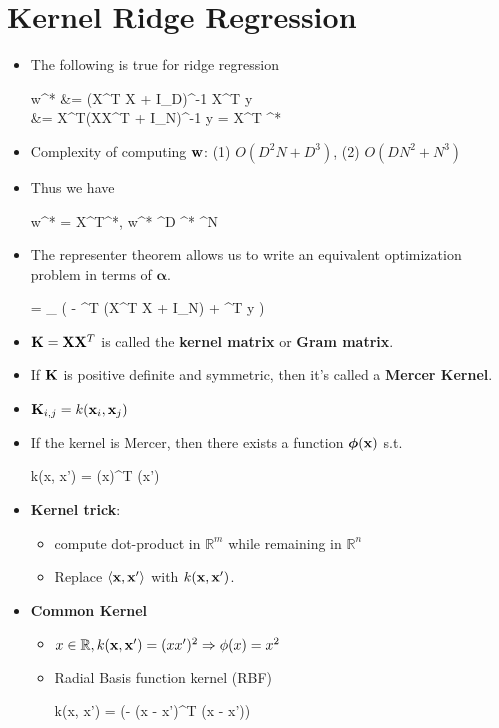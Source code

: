 \section{Kernel Ridge Regression}
\begin{itemize}
	\item The following is true for ridge regression
	\begin{myalign*}
	    \* w^* &= (\*X^T \*X + \lambda \*I_D)^{-1} \*X^T \*y \\
	    &= \*X^T(\*X\*X^T + \lambda \*I_N)^{-1} \*y = \*X^T \bm \alpha^* 
	\end{myalign*}
	\item Complexity of computing $\mathbf{w}$: (1) $O(D^2 N + D^3)$, (2) $O(D N^2 + N^3)$
	\item Thus we have
	\begin{myalign*}
	     \*w^* = \*X^T\bm \alpha^*, \quad {} \* w^* \in \R^D  \bm \alpha^* \in \R^N
	\end{myalign*}
	\item The representer theorem allows us to write an equivalent optimization problem in terms of $\bm \alpha$.
	\begin{myalign*}
	    \bm \alpha = \argmax_{\bm \alpha} 
	    \left(
	    - \bm \alpha^T (\*X^T \*X + \lambda \*I_N) \bm \alpha + \bm \alpha^T \*y 
	    \right)
	\end{myalign*}
	\item $\mathbf{K} = \mathbf{X} \mathbf{X}^T$ is called the \textbf{kernel matrix} or \textbf{Gram matrix}.
	\item If $\mathbf{K}$ is positive definite and symmetric, then it's called a \textbf{Mercer Kernel}.
	\item $\mathbf{K}_{i,j} = k(\mathbf{x}_i, \mathbf{x}_j)$
	\item If the kernel is Mercer, then there exists a function $\bm \phi(\mathbf{x})$ s.t.
	\begin{myalign*}
	    k(\*x, \*x') = \bm \phi(\*x)^T \bm \phi(\*x')
	\end{myalign*}
	\item \textbf{Kernel trick}: 
	\begin{itemize}
		\item compute dot-product in $\mathbb{R}^m$ while remaining in $\mathbb{R}^n$
		\item Replace $\langle \mathbf{x}, \mathbf{x}' \rangle$ with $k(\mathbf{x}, \mathbf{x}')$.
	\end{itemize}
	
	\item \textbf{Common Kernel}
	\begin{itemize}
		\item $x\in\mathbb{R}, k(\mathbf{x}, \mathbf{x}') = (xx')^2 \Rightarrow \phi(x)=x^2$
		\item Radial Basis function kernel (RBF)
			\begin{myalign*}
	    			 k(\*x, \*x') = \exp(- (\*x - \*x')^T (\*x - \*x'))
			 \end{myalign*}  
	\end{itemize}
	 

\end{itemize}
